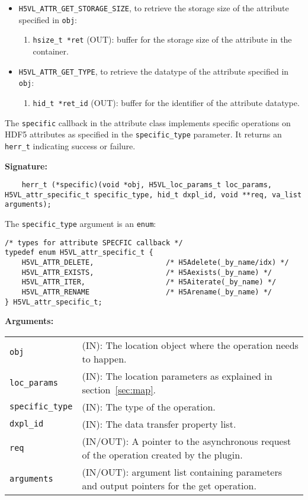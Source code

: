 \begin{itemize}
\item \texttt{H5VL\_ATTR\_GET\_STORAGE\_SIZE}, to retrieve the storage
  size of the attribute specified in \texttt{obj}:
  \begin{enumerate}
  \item \texttt{hsize\_t *ret} (OUT): buffer for the storage size of
    the attribute in the container.
  \end{enumerate}

\item \texttt{H5VL\_ATTR\_GET\_TYPE}, to retrieve the datatype of the
  attribute specified in \texttt{obj}:
  \begin{enumerate}
  \item \texttt{hid\_t *ret\_id} (OUT): buffer for the identifier of the
    attribute datatype.
  \end{enumerate}
  
\end{itemize}

The \texttt{specific} callback in the attribute class implements specific operations on HDF5 attributes as specified in the \texttt{specific\_type} parameter. It returns an \texttt{herr\_t} indicating success or failure.\bigskip

\begin{mdframed}[style=bgbox]
\textbf{Signature:}
\begin{lstlisting}
	herr_t (*specific)(void *obj, H5VL_loc_params_t loc_params, H5VL_attr_specific_t specific_type, hid_t dxpl_id, void **req, va_list arguments);
\end{lstlisting}

The \texttt{specific\_type} argument is an \texttt{enum}:
\begin{lstlisting}
/* types for attribute SPECFIC callback */
typedef enum H5VL_attr_specific_t {
    H5VL_ATTR_DELETE,                 /* H5Adelete(_by_name/idx) */
    H5VL_ATTR_EXISTS,                 /* H5Aexists(_by_name) */
    H5VL_ATTR_ITER,                   /* H5Aiterate(_by_name) */
    H5VL_ATTR_RENAME                  /* H5Arename(_by_name) */
} H5VL_attr_specific_t;
\end{lstlisting}

\textbf{Arguments:}\\
\begin{tabular}{l p{10cm}}
  \texttt{obj} & (IN): The location object  where the operation needs to happen.\\
  \texttt{loc\_params} & (IN): The location parameters as explained in section~\ref{sec:map}.\\
  \texttt{specific\_type} & (IN): The type of the operation.\\
  \texttt{dxpl\_id} & (IN): The data transfer property list.\\
  \texttt{req} & (IN/OUT): A pointer to the asynchronous request of the
  operation created by the plugin.\\
  \texttt{arguments} & (IN/OUT): argument list containing parameters and
  output pointers for the get operation. \\
\end{tabular}
\end{mdframed}

